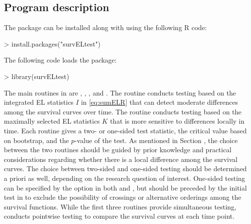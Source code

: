 \subsection{Program description} \label{sec:prog_describe}



The  package %
can be installed along with  using the following R code: \\ 
\begin{example}
>   install.packages("survELtest")
\end{example}
The following code loads the package:\\  %
\begin{example}
>   library(survELtest)
\end{example}
The main routines in  are , , , and . The  routine conducts testing based on the integrated EL statistics $I$ in \eqref{eq:sumELR} that can detect moderate differences among the survival curves over time.
The  routine conducts testing based on the maximally selected EL statistics $K$ that is more sensitive to differences locally in time.
Each routine gives a two- or one-sided test statistic, the critical value based on bootstrap, and the $p$-value of the test. 
As mentioned in Section , the choice between the two routines should be guided by prior knowledge and practical considerations regarding whether there is a local difference among the survival curves. 
The choice between two-sided and one-sided testing should be determined a priori as well, depending on the research question of interest.
One-sided testing can be specified by the option  in both  and , but should be preceded by the initial test in  to exclude the possibility of crossings or alternative orderings among the survival functions. 
While the first three routines provide simultaneous testing,
 conducts pointwise testing to compare the survival curves at each time point. %

